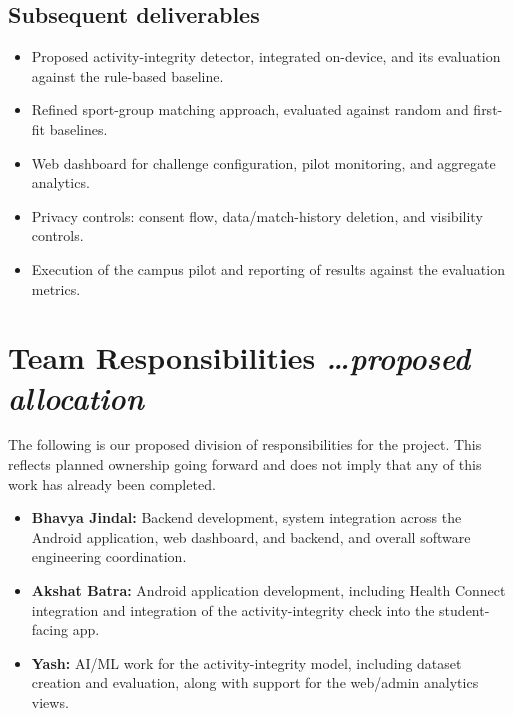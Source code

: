 \documentclass[11pt,a4paper]{article}
\newcommand{\BvrHint}[1]{%
  {\normalfont\normalsize\itshape\hfill #1}}
\begin{document}
\subsection{Subsequent deliverables}
\begin{itemize}[leftmargin=0.7cm]
    \item Proposed activity-integrity detector, integrated on-device, and its evaluation against the rule-based baseline.
    \item Refined sport-group matching approach, evaluated against random and first-fit baselines.
    \item Web dashboard for challenge configuration, pilot monitoring, and aggregate analytics.
    \item Privacy controls: consent flow, data/match-history deletion, and visibility controls.
    \item Execution of the campus pilot and reporting of results against the evaluation metrics.
\end{itemize}

\section{Team Responsibilities %
\BvrHint{\ldots proposed allocation}}
The following is our proposed division of responsibilities for the
project. This reflects planned ownership going forward and does not
imply that any of this work has already been completed.
\begin{itemize}[leftmargin=0.7cm]
    \item \textbf{Bhavya Jindal:} Backend development, system integration across the Android application, web dashboard, and backend, and overall software engineering coordination.
    \item \textbf{Akshat Batra:} Android application development, including Health Connect integration and integration of the activity-integrity check into the student-facing app.
    \item \textbf{Yash:} AI/ML work for the activity-integrity model, including dataset creation and evaluation, along with support for the web/admin analytics views.
\end{itemize}
\end{document}
